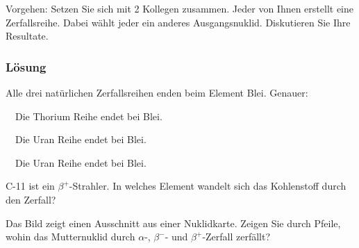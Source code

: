 \documentclass[12pt,a4paper,twoside]{article}
\begin{document}
Vorgehen: Setzen Sie sich mit 2 Kollegen zusammen. Jeder von Ihnen erstellt eine Zerfallsreihe. Dabei wählt jeder ein anderes Ausgangsnuklid. Diskutieren Sie Ihre Resultate.

\subsubsection*{Lösung}
Alle drei natürlichen Zerfallsreihen enden beim Element Blei. Genauer:

{\textbullet}\ \ Die Thorium Reihe endet bei Blei.

{\textbullet}\ \ Die Uran Reihe endet bei Blei.

{\textbullet}\ \ Die Uran Reihe endet bei Blei.















\begin{aufgabe}
	C-11 ist ein $\beta^{+}$-Strahler. In welches Element wandelt sich das Kohlenstoff durch den Zerfall?
\end{aufgabe}

\begin{aufgabe}
	Das Bild zeigt einen Ausschnitt aus einer Nuklidkarte. 
	Zeigen Sie durch Pfeile, wohin das Mutternuklid durch $\alpha$-, $\beta^{-}$- und $\beta^{+}$-Zerfall zerfällt?

	\begin{center}
		
	\end{center}

\end{aufgabe}
\end{document}
